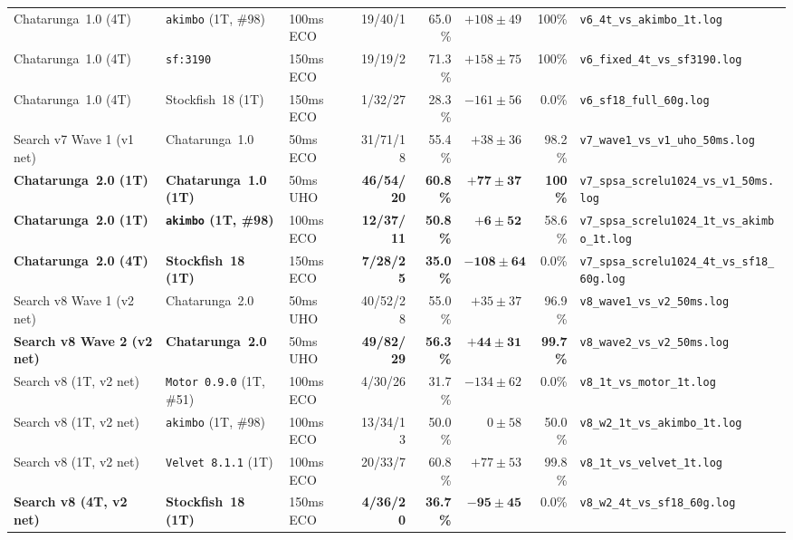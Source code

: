 \documentclass[10.5pt,letterpaper]{article}
\begin{document}
\begin{table}[H]
{\begin{tabular}{@{}lllrrrrl@{}}
Chatarunga~1.0 (4T) & \texttt{akimbo} (1T, \#98) & 100ms ECO & 19/40/1 & 65.0\% & $+108 \pm 49$ & 100\% & \texttt{v6\_4t\_vs\_akimbo\_1t.log} \\
Chatarunga~1.0 (4T) & \texttt{sf:3190} & 150ms ECO & 19/19/2 & 71.3\% & $+158 \pm 75$ & 100\% & \texttt{v6\_fixed\_4t\_vs\_sf3190.log} \\
Chatarunga~1.0 (4T) & Stockfish~18 (1T) & 150ms ECO & 1/32/27 & 28.3\% & $-161 \pm 56$ & 0.0\% & \texttt{v6\_sf18\_full\_60g.log} \\
\midrule
Search v7 Wave 1 (v1 net) & Chatarunga~1.0 & 50ms ECO & 31/71/18 & 55.4\% & $+38 \pm 36$ & 98.2\% & \texttt{v7\_wave1\_vs\_v1\_uho\_50ms.log} \\
\textbf{Chatarunga~2.0 (1T)} & \textbf{Chatarunga~1.0 (1T)} & 50ms UHO & \textbf{46/54/20} & \textbf{60.8\%} & $\mathbf{+77 \pm 37}$ & \textbf{100\%} & \texttt{v7\_spsa\_screlu1024\_vs\_v1\_50ms.log} \\
\textbf{Chatarunga~2.0 (1T)} & \textbf{\texttt{akimbo} (1T, \#98)} & 100ms ECO & \textbf{12/37/11} & \textbf{50.8\%} & $\mathbf{+6 \pm 52}$ & 58.6\% & \texttt{v7\_spsa\_screlu1024\_1t\_vs\_akimbo\_1t.log} \\
\textbf{Chatarunga~2.0 (4T)} & \textbf{Stockfish~18 (1T)} & 150ms ECO & \textbf{7/28/25} & \textbf{35.0\%} & $\mathbf{-108 \pm 64}$ & 0.0\% & \texttt{v7\_spsa\_screlu1024\_4t\_vs\_sf18\_60g.log} \\
\midrule
Search v8 Wave 1 (v2 net) & Chatarunga~2.0 & 50ms UHO & 40/52/28 & 55.0\% & $+35 \pm 37$ & 96.9\% & \texttt{v8\_wave1\_vs\_v2\_50ms.log} \\
\textbf{Search v8 Wave 2 (v2 net)} & \textbf{Chatarunga~2.0} & 50ms UHO & \textbf{49/82/29} & \textbf{56.3\%} & $\mathbf{+44 \pm 31}$ & \textbf{99.7\%} & \texttt{v8\_wave2\_vs\_v2\_50ms.log} \\
Search v8 (1T, v2 net) & \texttt{Motor 0.9.0} (1T, \#51) & 100ms ECO & 4/30/26 & 31.7\% & $-134 \pm 62$ & 0.0\% & \texttt{v8\_1t\_vs\_motor\_1t.log} \\
Search v8 (1T, v2 net) & \texttt{akimbo} (1T, \#98) & 100ms ECO & 13/34/13 & 50.0\% & $0 \pm 58$ & 50.0\% & \texttt{v8\_w2\_1t\_vs\_akimbo\_1t.log} \\
Search v8 (1T, v2 net) & \texttt{Velvet 8.1.1} (1T) & 100ms ECO & 20/33/7 & 60.8\% & $+77 \pm 53$ & 99.8\% & \texttt{v8\_1t\_vs\_velvet\_1t.log} \\
\textbf{Search v8 (4T, v2 net)} & \textbf{Stockfish~18 (1T)} & 150ms ECO & \textbf{4/36/20} & \textbf{36.7\%} & $\mathbf{-95 \pm 45}$ & 0.0\% & \texttt{v8\_w2\_4t\_vs\_sf18\_60g.log} \\

\end{tabular}}
\end{table}
\end{document}
